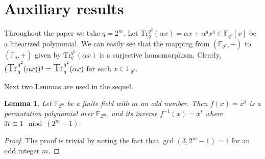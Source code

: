 \documentclass{birkjour}
\newtheorem{lem}[thm]{Lemma}
\theoremstyle{definition}
\theoremstyle{remark}
\numberwithin{equation}{section}
\begin{document}
	\section{Auxiliary results}
Throughout the paper we take $q=2^m$. Let ${\mbox{Tr}}_{q}^{q^2}(\alpha x)=\alpha x+\alpha^{q}x^{q}\in \mathbb{F}_{q^{2}}[x]$ be a linearized polynomial. We can easily see that the mapping from $(\mathbb{F}_{q^{2}}, +)$ to $(\mathbb{F}_{q}, +)$ given by ${\mbox{Tr}}_{q}^{q^2}(\alpha x)$ is a surjective homomorphism. Clearly, $\Large({\mbox{Tr}}_{q}^{q^2}(\alpha x)\Large)^{q}={\mbox{Tr}}_{q}^{q^2}(\alpha x)$ for each $x \in \mathbb{F}_{q^{2}}$.

Next two Lemmas are used in the sequel.
	\begin{lem} \label{lem0}
	Let $\mathbb{F}_{2^{m}}$ be a finite field with $m$ an odd number. Then	$f(x)=x^3$ is a permutation polynomial over $\mathbb{F}_{2^{m}}$, and its inverse $f^{-1}(x)=x^{t}$ where $3t\equiv 1\mod{(2^m-1)}$.
	\end{lem}
	\begin{proof}
		The proof is trivial by noting the fact that $\gcd(3,2^m-1)=1$ for an odd integer $m$. 
	\end{proof}
	
\end{document}
